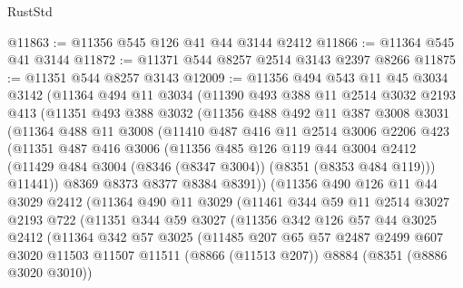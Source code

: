 \begin{lexlean}{RustStd}
\begin{coremodule}
@11863 := @11356 @545 @126 @41 @44 @3144 @2412
@11866 := @11364 @545 @41 @3144
@11872 := @11371 @544 @8257 @2514 @3143 @2397 @8266
@11875 := @11351 @544 @8257 @3143
@12009 := @11356
    @494
    @543
    @11
    @45
    @3034
    @3142
    (@11364
      @494
      @11
      @3034
      (@11390
        @493
        @388
        @11
        @2514
        @3032
        @2193
        @413
        (@11351
          @493
          @388
          @3032
          (@11356
            @488
            @492
            @11
            @387
            @3008
            @3031
            (@11364
              @488
              @11
              @3008
              (@11410
                @487
                @416
                @11
                @2514
                @3006
                @2206
                @423
                (@11351
                  @487
                  @416
                  @3006
                  (@11356
                    @485
                    @126
                    @119
                    @44
                    @3004
                    @2412
                    (@11429 @484 @3004 (@8346 (@8347 @3004)) (@8351 (@8353 @484 @119)))
                    @11441))
                @8369
                @8373
                @8377
                @8384
                @8391))
            (@11356
              @490
              @126
              @11
              @44
              @3029
              @2412
              (@11364
                @490
                @11
                @3029
                (@11461
                  @344
                  @59
                  @11
                  @2514
                  @3027
                  @2193
                  @722
                  (@11351
                    @344
                    @59
                    @3027
                    (@11356
                      @342
                      @126
                      @57
                      @44
                      @3025
                      @2412
                      (@11364
                        @342
                        @57
                        @3025
                        (@11485
                          @207
                          @65
                          @57
                          @2487
                          @2499
                          @607
                          @3020
                          @11503
                          @11507
                          @11511
                          (@8866 (@11513 @207))
                          @8884
                          (@8351 (@8886 @3020 @3010))

\end{coremodule}
\end{lexlean}
